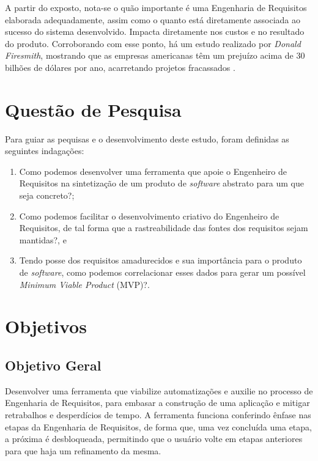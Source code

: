 A partir do exposto, nota-se o quão importante é uma Engenharia de Requisitos elaborada adequadamente, assim como o quanto está diretamente associada ao sucesso do sistema desenvolvido. Impacta diretamente nos custos e no resultado do produto. Corroborando com esse ponto, há um estudo realizado por \textit{Donald Firesmith}, mostrando que as empresas americanas têm um prejuízo acima de 30 bilhões de dólares por ano, acarretando projetos fracassados \cite{king2008cost}.

\section{Questão de Pesquisa}

\label{ref:questao_pesquisa}

Para guiar as pequisas e o desenvolvimento deste estudo, foram definidas as seguintes indagações:

\begin{enumerate}
    \item Como podemos desenvolver uma ferramenta que apoie o Engenheiro de Requisitos na sintetização de um produto de \textit{software} abstrato para um que seja concreto?;
    \item Como podemos facilitar o desenvolvimento criativo do Engenheiro de Requisitos, de tal forma que a rastreabilidade das fontes dos requisitos sejam mantidas?, e
    \item Tendo posse dos requisitos amadurecidos e sua importância para o produto de \textit{software}, como podemos correlacionar esses dados para gerar um possível \textit{Minimum Viable Product} (MVP)?.
\end{enumerate}

\section{Objetivos}

\label{ref:objetivos}

\subsection{Objetivo Geral}

Desenvolver uma ferramenta que viabilize automatizações e auxilie no processo de Engenharia de Requisitos, para embasar a construção de uma aplicação e mitigar retrabalhos e desperdícios de tempo. A ferramenta funciona conferindo ênfase nas etapas da Engenharia de Requisitos, de forma que, uma vez concluída uma etapa, a próxima é desbloqueada, permitindo que o usuário volte em etapas anteriores para que haja um refinamento da mesma.

